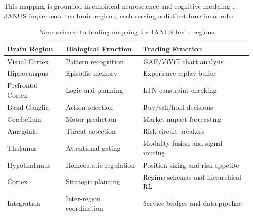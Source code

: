 \documentclass[12pt, a4paper]{article}
\begin{document}
This mapping is grounded in empirical neuroscience and cognitive modeling \citep{frank2006working, collins2014opponent, foster2013hierarchical}. JANUS implements ten brain regions, each serving a distinct functional role:

\begin{table}[htbp]
	\centering
	\caption{Neuroscience-to-trading mapping for JANUS brain regions}
	\label{tab:brain_mapping}
	\begin{tabularx}{\textwidth}{|l|L|L|}
		\hline
		\textbf{Brain Region} & \textbf{Biological Function}                          & \textbf{Trading Function}                                        \\
		\hline
		Visual Cortex         & Pattern recognition                                   & GAF/ViViT chart analysis \citep{wang2015imaging, arnab2021vivit} \\
		\hline
		Hippocampus           & Episodic memory \citep{buzsaki2015hippocampal}        & Experience replay buffer \citep{schaul2015prioritized}           \\
		\hline
		Prefrontal Cortex     & Logic and planning \citep{frank2006working}           & LTN constraint checking \citep{badreddine2022logic}              \\
		\hline
		Basal Ganglia         & Action selection \citep{collins2014opponent}          & Buy/sell/hold decisions                                          \\
		\hline
		Cerebellum            & Motor prediction \citep{wolpert1998cerebellum}        & Market impact forecasting \citep{almgren2001optimal}             \\
		\hline
		Amygdala              & Threat detection \citep{ledoux2000emotion}            & Risk circuit breakers                                            \\
		\hline
		Thalamus              & Attentional gating \citep{halassa2017thalamic}        & Modality fusion and signal routing                               \\
		\hline
		Hypothalamus          & Homeostatic regulation \citep{sterling2012allostasis} & Position sizing and risk appetite                                \\
		\hline
		Cortex                & Strategic planning                                    & Regime schemas and hierarchical RL                               \\
		\hline
		Integration           & Inter-region coordination                             & Service bridges and data pipeline                                \\
		\hline
	\end{tabularx}
\end{table}
\end{document}
